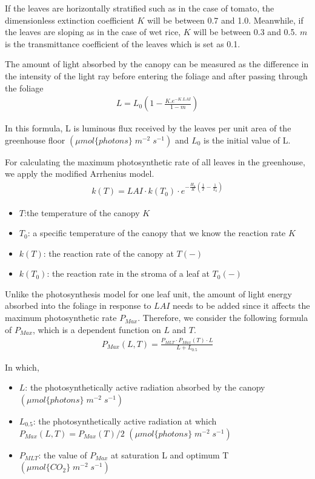 \documentclass[a4paper]{article}
\numberwithin{equation}{section}
\begin{document}
If the leaves are horizontally stratified such as in the case of tomato, the dimensionless extinction coefficient \(K\) will be between 0.7 and 1.0. Meanwhile, if the leaves are sloping as in the case of wet rice, \(K\) will be between 0.3 and 0.5. \(m\) is the transmittance coefficient of the leaves which is set as 0.1.

The amount of light absorbed by the canopy can be measured as the difference in the intensity of the light ray before entering the foliage and after passing through the foliage
\begin{gather}
  L =L_0(1 - \frac{K.e^{-K.LAI}}{1 - m})
\end{gather}

In this formula, L is luminous flux received by the leaves per unit area of the greenhouse floor \((\mu mol\{photons\}\;m^{-2}\;s^{-1})\) and \(L_0\) is the initial value of L.

For calculating the maximum photosynthetic rate of all leaves in the greenhouse, we apply the modified Arrhenius model.
\begin{gather}
  k(T) = LAI \cdot k(T_0) \cdot e^{-\frac{H_a}{R}(\frac{1}{T} - \frac{1}{T_0})}
\end{gather}
\begin{itemize}
  \item \(T\):the temperature of the canopy \(K \)
  \item \(T_0\): a specific temperature of the canopy that we know the reaction rate \(K \)
  \item \(k(T)\): the reaction rate of the canopy at \( T (-)\)
  \item \(k(T_0)\): the reaction rate in the stroma of a leaf at \( T_0 (-)\)
\end{itemize}

Unlike the photosynthesis model for one leaf unit, the amount of light energy absorbed into the foliage in response to \(LAI\) needs to be added since it affects the maximum photosynthetic rate \(P_{Max}\). Therefore, we consider the following formula of \(P_{Max}\), which is a dependent function on \(L\) and \(T\).
\begin{gather}
  P_{Max} (L,T) = \frac{P_{MLT} \cdot P_{Max}(T) \cdot L}{L + L_{0.5}}
\end{gather}


In which, 
\begin{itemize}
 \item \( L\): the photosynthetically active radiation absorbed by the canopy\((\mu mol\{photons\}\;m^{-2}\;s^{-1})\)
 \item \(L_{0.5}\): the photosynthetically active radiation at which \(P_{Max} (L,T) = P_{Max}(T)/2\) \((\mu mol\{photons\}\;m^{-2}\;s^{-1})\)
 \item \(P_{MLT}\): the value of \(P_{Max}\) at saturation L and optimum T \((\mu mol\{CO_2\}\;m^{-2}\;s^{-1})\)
\end{itemize}
\end{document}
